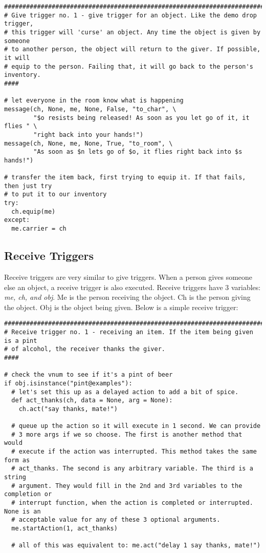 \documentclass[12pt]{article}
\begin{document}
{\bf \begin{verbatim}
################################################################################
# Give trigger no. 1 - give trigger for an object. Like the demo drop trigger,
# this trigger will 'curse' an object. Any time the object is given by someone
# to another person, the object will return to the giver. If possible, it will
# equip to the person. Failing that, it will go back to the person's inventory.
####

# let everyone in the room know what is happening
message(ch, None, me, None, False, "to_char", \
	    "$o resists being released! As soon as you let go of it, it flies " \
	    "right back into your hands!")
message(ch, None, me, None, True, "to_room", \
	    "As soon as $n lets go of $o, it flies right back into $s hands!")

# transfer the item back, first trying to equip it. If that fails, then just try
# to put it to our inventory
try:
  ch.equip(me)
except:
  me.carrier = ch
\end{verbatim}}



\subsection{Receive Triggers}
Receive triggers are very similar to give triggers. When a person gives someone else an object, a receive trigger is also executed. Receive triggers have 3 variables: {\it me, ch, and obj}. Me is the person receiving the object. Ch is the person giving the object. Obj is the object being given. Below is a simple receive trigger:


{\bf \begin{verbatim}
################################################################################
# Receive trigger no. 1 - receiving an item. If the item being given is a pint
# of alcohol, the receiver thanks the giver.
####

# check the vnum to see if it's a pint of beer
if obj.isinstance("pint@examples"):
  # let's set this up as a delayed action to add a bit of spice.
  def act_thanks(ch, data = None, arg = None):
    ch.act("say thanks, mate!")

  # queue up the action so it will execute in 1 second. We can provide
  # 3 more args if we so choose. The first is another method that would
  # execute if the action was interrupted. This method takes the same form as
  # act_thanks. The second is any arbitrary variable. The third is a string 
  # argument. They would fill in the 2nd and 3rd variables to the completion or
  # interrupt function, when the action is completed or interrupted. None is an 
  # acceptable value for any of these 3 optional arguments.
  me.startAction(1, act_thanks)
  
  # all of this was equivalent to: me.act("delay 1 say thanks, mate!")
\end{verbatim}}
\end{document}
